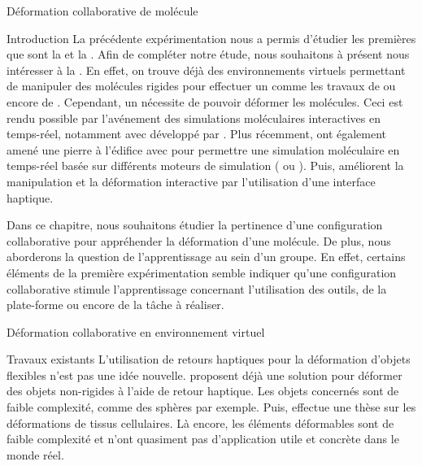\documentclass[myfrancais,ngerman,english,frenchb]{mythesis}
\begin{document}
	\begin{mychapter}{Déformation collaborative de molécule}
		\begin{mysection}{Introduction}
			La précédente expérimentation nous a permis d'étudier les premières  que sont la  et la .
			Afin de compléter notre étude, nous souhaitons à présent nous intéresser à la .
			En effet, on trouve déjà des environnements virtuels permettant de manipuler des molécules rigides pour effectuer un  comme les travaux de  ou encore de .
			Cependant, un  nécessite de pouvoir déformer les molécules.
			Ceci est rendu possible par l'avénement des simulations moléculaires interactives en temps-réel, notamment avec  développé par .
			Plus récemment,  ont également amené une pierre à l'édifice avec \myMDDriver pour permettre une simulation moléculaire en temps-réel basée sur différents moteurs de simulation ( ou \myGromacs).
			Puis,  améliorent la manipulation et la déformation interactive par l'utilisation d'une interface haptique.

			Dans ce chapitre, nous souhaitons étudier la pertinence d'une configuration collaborative pour appréhender la déformation d'une molécule.
			De plus, nous aborderons la question de l'apprentissage au sein d'un groupe.
			En effet, certains éléments de la première expérimentation semble indiquer qu'une configuration collaborative stimule l'apprentissage concernant l'utilisation des outils, de la plate-forme ou encore de la tâche à réaliser.
		\end{mysection}
		\begin{mysection}{Déformation collaborative en environnement virtuel}
			\begin{mysubsection}{Travaux existants}
				L'utilisation de retours haptiques pour la déformation d'objets flexibles n'est pas une idée nouvelle.
				 proposent déjà une solution pour déformer des objets non-rigides à l'aide de retour haptique.
				Les objets concernés sont de faible complexité, comme des sphères par exemple.
				Puis,  effectue une thèse sur les déformations de tissus cellulaires.
				Là encore, les éléments déformables sont de faible complexité et n'ont quasiment pas d'application utile et concrète dans le monde réel.


\end{mysubsection}
\end{mysection}
\end{mychapter}
\end{document}
